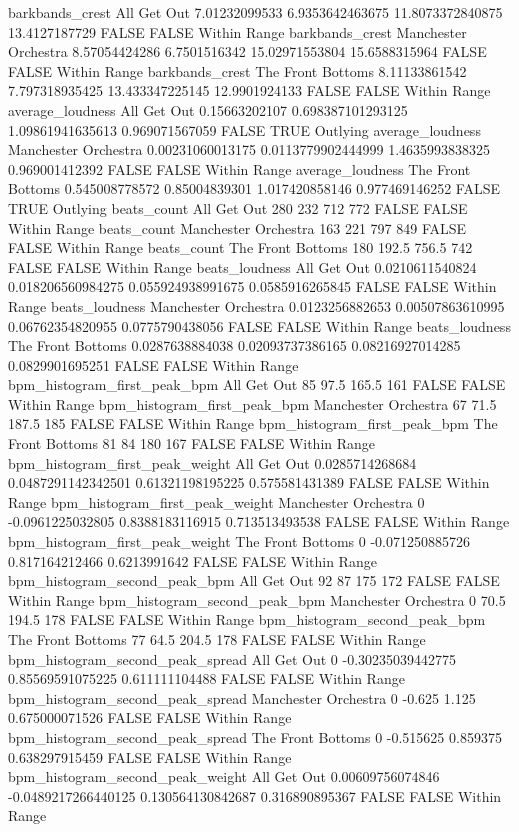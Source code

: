barkbands_crest All Get Out 7.01232099533 6.9353642463675 11.8073372840875 13.4127187729 FALSE FALSE Within Range
barkbands_crest Manchester Orchestra 8.57054424286 6.7501516342 15.02971553804 15.6588315964 FALSE FALSE Within Range
barkbands_crest The Front Bottoms 8.11133861542 7.797318935425 13.433347225145 12.9901924133 FALSE FALSE Within Range
average_loudness All Get Out 0.15663202107 0.698387101293125 1.09861941635613 0.969071567059 FALSE TRUE Outlying
average_loudness Manchester Orchestra 0.00231060013175 0.0113779902444999 1.4635993838325 0.969001412392 FALSE FALSE Within Range
average_loudness The Front Bottoms 0.545008778572 0.85004839301 1.017420858146 0.977469146252 FALSE TRUE Outlying
beats_count All Get Out 280 232 712 772 FALSE FALSE Within Range
beats_count Manchester Orchestra 163 221 797 849 FALSE FALSE Within Range
beats_count The Front Bottoms 180 192.5 756.5 742 FALSE FALSE Within Range
beats_loudness All Get Out 0.0210611540824 0.018206560984275 0.055924938991675 0.0585916265845 FALSE FALSE Within Range
beats_loudness Manchester Orchestra 0.0123256882653 0.00507863610995 0.06762354820955 0.0775790438056 FALSE FALSE Within Range
beats_loudness The Front Bottoms 0.0287638884038 0.02093737386165 0.08216927014285 0.0829901695251 FALSE FALSE Within Range
bpm_histogram_first_peak_bpm All Get Out 85 97.5 165.5 161 FALSE FALSE Within Range
bpm_histogram_first_peak_bpm Manchester Orchestra 67 71.5 187.5 185 FALSE FALSE Within Range
bpm_histogram_first_peak_bpm The Front Bottoms 81 84 180 167 FALSE FALSE Within Range
bpm_histogram_first_peak_weight All Get Out 0.0285714268684 0.0487291142342501 0.61321198195225 0.575581431389 FALSE FALSE Within Range
bpm_histogram_first_peak_weight Manchester Orchestra 0 -0.0961225032805 0.8388183116915 0.713513493538 FALSE FALSE Within Range
bpm_histogram_first_peak_weight The Front Bottoms 0 -0.071250885726 0.817164212466 0.6213991642 FALSE FALSE Within Range
bpm_histogram_second_peak_bpm All Get Out 92 87 175 172 FALSE FALSE Within Range
bpm_histogram_second_peak_bpm Manchester Orchestra 0 70.5 194.5 178 FALSE FALSE Within Range
bpm_histogram_second_peak_bpm The Front Bottoms 77 64.5 204.5 178 FALSE FALSE Within Range
bpm_histogram_second_peak_spread All Get Out 0 -0.30235039442775 0.85569591075225 0.611111104488 FALSE FALSE Within Range
bpm_histogram_second_peak_spread Manchester Orchestra 0 -0.625 1.125 0.675000071526 FALSE FALSE Within Range
bpm_histogram_second_peak_spread The Front Bottoms 0 -0.515625 0.859375 0.638297915459 FALSE FALSE Within Range
bpm_histogram_second_peak_weight All Get Out 0.00609756074846 -0.0489217266440125 0.130564130842687 0.316890895367 FALSE FALSE Within Range
